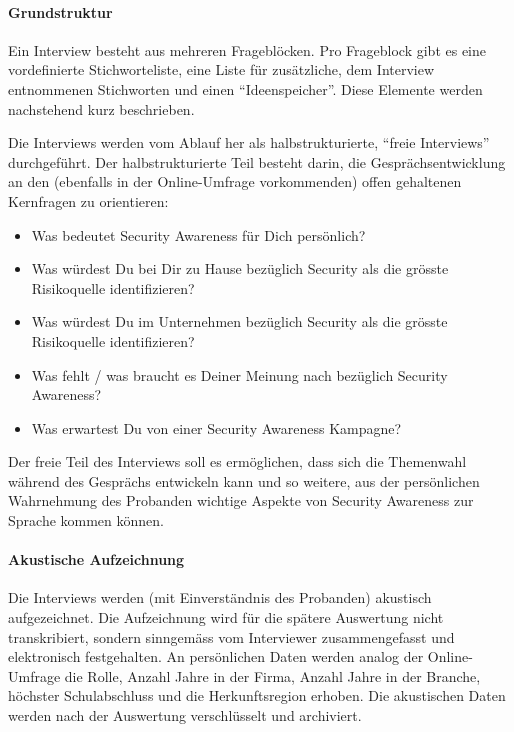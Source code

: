 \documentclass[../../main.tex]{subfiles}
\begin{document}
\paragraph*{Grundstruktur}\mbox{}

\begin{sloppypar}
Ein Interview besteht aus mehreren Frageblöcken. Pro Frageblock gibt es eine vordefinierte Stichworteliste, eine Liste für zusätzliche, dem Interview entnommenen Stichworten und einen "`Ideenspeicher"'. Diese Elemente werden nachstehend kurz beschrieben.

Die Interviews werden vom Ablauf her als halbstrukturierte, "`freie Interviews"' durchgeführt. Der halbstrukturierte Teil besteht darin, die Gesprächsentwicklung an den (ebenfalls in der Online-Umfrage vorkommenden) offen gehaltenen Kernfragen zu orientieren:

\begin{itemize}
  \item Was bedeutet Security Awareness für Dich persönlich?
  \item Was würdest Du bei Dir zu Hause bezüglich Security als die grösste Risikoquelle identifizieren? 
  \item Was würdest Du im Unternehmen bezüglich Security als die grösste Risikoquelle identifizieren?
  \item Was fehlt / was braucht es Deiner Meinung nach bezüglich Security Awareness?
  \item Was erwartest Du von einer Security Awareness Kampagne?
\end{itemize}

Der freie Teil des Interviews soll es ermöglichen, dass sich die Themenwahl während des Gesprächs entwickeln kann und so weitere, aus der persönlichen Wahrnehmung des Probanden wichtige Aspekte von Security Awareness zur Sprache kommen können. 
\end{sloppypar}

\paragraph*{Akustische Aufzeichnung}\mbox{}

\begin{sloppypar}
Die Interviews werden (mit Einverständnis des Probanden) akustisch aufgezeichnet. Die Aufzeichnung wird für die spätere Auswertung nicht transkribiert, sondern sinngemäss vom Interviewer zusammengefasst und elektronisch festgehalten. An persönlichen Daten werden analog der Online-Umfrage die Rolle, Anzahl Jahre in der Firma, Anzahl Jahre in der Branche, höchster Schulabschluss und die Herkunftsregion erhoben. Die akustischen Daten werden nach der Auswertung verschlüsselt und archiviert.
\end{sloppypar}
\end{document}
